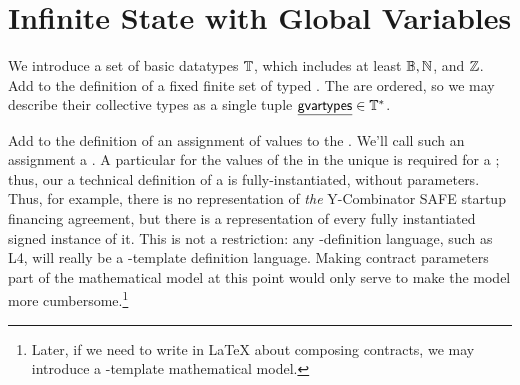 \documentclass[12pt]{article}
\begin{document}
\section{Infinite State with Global Variables} \label{globalvars}
\medskip




We introduce a set of basic datatypes $\mathbb{T}$, which includes at least $\mathbb{B}, \mathbb{N}$, and $\mathbb{Z}$. Add to the definition of \Contract a fixed finite set of typed . The \GVars are ordered, so we may describe their collective types as a single tuple $\underline{{\sf gvartypes}} \in \mathbb{T}^* $.

Add to the definition of \GlobalState an assignment of values to the \GVars. We'll call such an assignment a . A particular \gvarsassign {} for the values of the \GVars in the unique \startstate is required for a \Contract; thus, our a technical definition of a \Contract is fully-instantiated, without parameters. Thus, for example, there is no \Contract representation of {\it the} Y-Combinator SAFE startup financing agreement, but there is a \Contract representation of every fully instantiated signed instance of it. This is not a restriction: any \Contract-definition language, such as L4, will really be a \Contract-template definition language. Making contract parameters part of the mathematical model at this point would only serve to make the model more cumbersome.\footnote{Later, if we need to write in \LaTeX\xspace about composing contracts, we may introduce a \Contract-template mathematical model.} %

\end{document}
